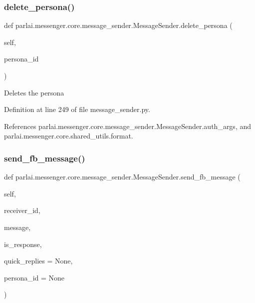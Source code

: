 \subsubsection{\texorpdfstring{delete\+\_\+persona()}{delete\_persona()}}
{\footnotesize\ttfamily def parlai.\+messenger.\+core.\+message\+\_\+sender.\+Message\+Sender.\+delete\+\_\+persona (\begin{DoxyParamCaption}\item[{}]{self,  }\item[{}]{persona\+\_\+id }\end{DoxyParamCaption})}

\begin{DoxyVerb}Deletes the persona\end{DoxyVerb}
 

Definition at line 249 of file message\+\_\+sender.\+py.



References parlai.\+messenger.\+core.\+message\+\_\+sender.\+Message\+Sender.\+auth\+\_\+args, and parlai.\+messenger.\+core.\+shared\+\_\+utils.\+format.

\mbox{\label{classparlai_1_1messenger_1_1core_1_1message__sender_1_1MessageSender_ac323160e9bbb201ed0c64b819f1c78ca}} 
\subsubsection{\texorpdfstring{send\+\_\+fb\+\_\+message()}{send\_fb\_message()}}
{\footnotesize\ttfamily def parlai.\+messenger.\+core.\+message\+\_\+sender.\+Message\+Sender.\+send\+\_\+fb\+\_\+message (\begin{DoxyParamCaption}\item[{}]{self,  }\item[{}]{receiver\+\_\+id,  }\item[{}]{message,  }\item[{}]{is\+\_\+response,  }\item[{}]{quick\+\_\+replies = {\ttfamily None},  }\item[{}]{persona\+\_\+id = {\ttfamily None} }\end{DoxyParamCaption})}


